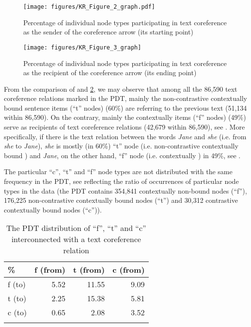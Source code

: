 \documentclass[output=paper]{langsci/langscibook.cls}
\begin{document}
\begin{figure}[p]
\texttt{[image: figures/KR\_Figure\_2\_graph.pdf]}
\caption{Percentage of individual node types participating in text coreference as the sender of the coreference arrow (its starting point)}
\label{rysova_k:fig:2}
\end{figure}


\begin{figure}[p]
\texttt{[image: figures/KR\_Figure\_3\_graph]}
\caption{Percentage of individual node types participating in text coreference as the recipient of the coreference arrow (its ending point)}
\label{rysova_k:fig:3}
\end{figure}



From the comparison of  and \ref{rysova_k:fig:3}, we may observe that among all the 86,590 text coreference relations marked in the PDT, mainly the non-contrastive contextually bound sentence items (``t'' nodes) (60\%) are referring to the previous text (51,134 within 86,590). On the contrary, mainly the contextually  items (``f'' nodes) (49\%) serve as recipients of text coreference relations (42,679 within 86,590), see . More specifically, if there is the  text relation between the words \textit{Jane} and\textit{ she} (i.e. from \textit{she} to \textit{Jane}), \textit{she} is mostly (in 60\%) ``t'' node (i.e. non-contrastive contextually bound ) and\textit{ Jane}, on the other hand, ``f'' node (i.e. contextually ) in 49\%, see .

The particular ``c'', ``t'' and ``f'' node types are not distributed with the same frequency in the PDT, see  reflecting the ratio of occurrences of particular node types in the data (the PDT contains 354,841 contextually non-bound nodes (``f''), 176,225 non-contrastive contextually bound nodes (``t'') and 30,312 contrastive contextually bound nodes (``c'')).



\begin{table}
\caption{The PDT distribution of ``f'', ``t'' and ``c'' interconnected with a text coreference relation}
\begin{tabularx}{.8\textwidth}{Xrrr}
\lsptoprule
\% &
f (from) &
t (from) &
c (from)\\ 
\midrule
f (to) &
5.52 &
11.55 &
9.09\\ 
t (to) &
2.25 &
15.38 &
5.81\\ 
c (to) &
0.65 &
2.08 &
3.52\\
\lspbottomrule
\end{tabularx}
\label{rysova_k:tab:2}
\end{table}
\end{document}
